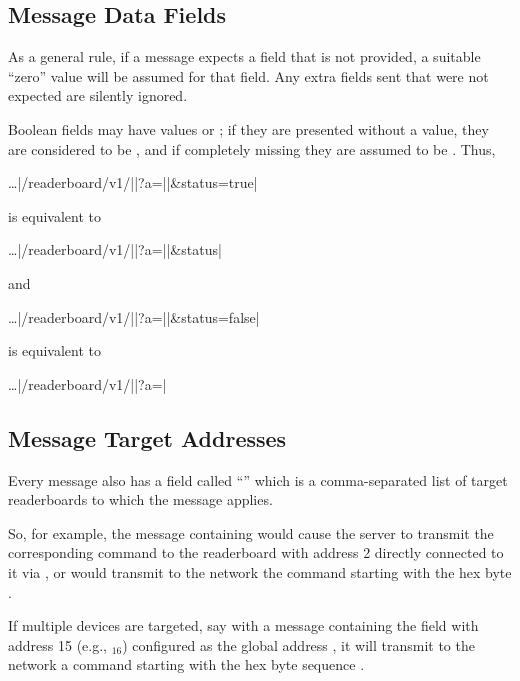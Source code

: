 \subsection{Message Data Fields}
As a general rule, if a message expects a field that is not provided, a suitable ``zero'' value will be assumed
for that field. Any extra fields sent that were not expected are silently ignored.

Boolean fields may have values  or ; if they are presented without a value, they are considered to be
, and if completely missing they are assumed to be . Thus,

\begin{Coding}
	\dots|/readerboard/v1/||?a=||&status=true|
\end{Coding}

\noindent is equivalent to

\begin{Coding}
	\dots|/readerboard/v1/||?a=||&status|
\end{Coding}

\noindent and

\begin{Coding}
	\dots|/readerboard/v1/||?a=||&status=false|
\end{Coding}

\noindent is equivalent to

\begin{Coding}
	\dots|/readerboard/v1/||?a=|
\end{Coding}

\subsection{Message Target Addresses}
Every message also has a field called ``'' which is a comma-separated list of target readerboards to which the message
applies.

So, for example, the message containing  would cause the server to transmit the corresponding command to the readerboard with address 2 directly connected to it via , or
would transmit to the  network the command starting with the hex byte .

If multiple devices are targeted, say with a message containing the field  with address 15 (e.g., $_{16}$) configured as the global address ,
it will transmit to the  network a command starting with the hex byte sequence .
